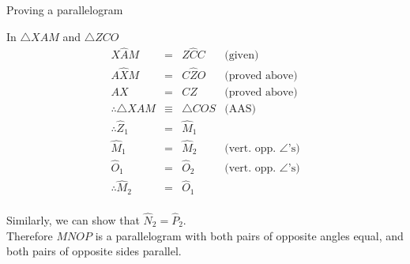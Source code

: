 \begin{wex}{Proving a parallelogram}
{In $\triangle XAM$ and $\triangle ZCO$ \\
\begin{equation*}
 \begin{array}{rcll}
X\hat{A}M &=& Z\hat{C}C & \mbox{(given)} \\
A\hat{X}M &=& C\hat{Z}O & \mbox{(proved above)} \\
AX &=& CZ & \mbox{(proved above)} \\
\therefore \triangle XAM &\equiv& \triangle COS & \mbox{(AAS)} \\
\therefore \hat{Z}_{1} &=& \hat{M}_{1} & \\
\hat{M}_1 &=& \hat{M}_2 & \mbox{(vert. opp. $\angle$'s)} \\
\hat{O}_{1} &=& \hat{O}_2 & \mbox{(vert. opp. $\angle$'s)} \\
\therefore \hat{M}_2 &=& \hat{O}_{1} & \\
 \end{array}
\end{equation*}

Similarly, we can show that $\hat{N}_2 = \hat{P}_2$. \\
Therefore $MNOP$ is a parallelogram with both pairs of opposite angles equal, and both pairs of opposite sides parallel.
}
\end{wex}


